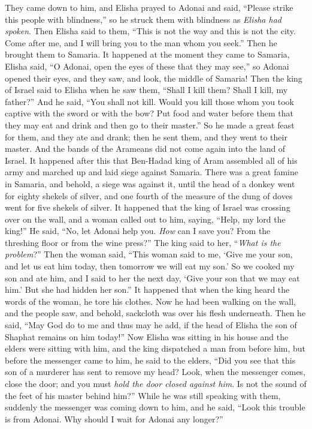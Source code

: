 \begin{biblechapter}
\verse They came down to him, and Elisha prayed to Adonai and said, “Please strike this people with blindness,” so he struck them with blindness as \textit{Elisha had spoken}.
\verse Then Elisha said to them, “This is not the way and this is not the city. Come after me, and I will bring you to the man whom you seek.” Then he brought them to Samaria.
\verse It happened at the moment they came to Samaria, Elisha said, “O Adonai, open the eyes of these that they may see,” so Adonai opened their eyes, and they saw, and look, the middle of Samaria!
\verse Then the king of Israel said to Elisha when he saw them, “Shall I kill them? Shall I kill, my father?”
\verse And he said, “You shall not kill. Would you kill those whom you took captive with the sword or with the bow? Put food and water before them that they may eat and drink and then go to their master.”
\verse So he made a great feast for them, and they ate and drank; then he sent them, and they went to their master. And the bands of the Arameans did not come again into the land of Israel.
 It happened after this that Ben-Hadad king of Aram assembled all of his army and marched up and laid siege against Samaria.
\verse There was a great famine in Samaria, and behold, a siege was against it, until the head of a donkey went for eighty shekels of silver, and one fourth of the measure of the dung of doves went for five shekels of silver.
\verse It happened that the king of Israel was crossing over on the wall, and a woman called out to him, saying, “Help, my lord the king!”
\verse He said, “No, let Adonai help you. \textit{How} can I save you? From the threshing floor or from the wine press?”
\verse The king said to her, “\textit{What is the problem}?” Then the woman said, “This woman said to me, ‘Give me your son, and let us eat him today, then tomorrow we will eat my son.’
\verse So we cooked my son and ate him, and I said to her the next day, ‘Give your son that we may eat him.’ But she had hidden her son.”
\verse It happened that when the king heard the words of the woman, he tore his clothes. Now he had been walking on the wall, and the people saw, and behold, sackcloth was over his flesh underneath.
\verse Then he said, “May God do to me and thus may he add, if the head of Elisha the son of Shaphat remains on him today!”
\verse Now Elisha was sitting in his house and the elders were sitting with him, and the king dispatched a man from before him, but before the messenger came to him, he said to the elders, “Did you see that this son of a murderer has sent to remove my head? Look, when the messenger comes, close the door; and you must \textit{hold the door closed against him}. Is not the sound of the feet of his master behind him?”
\verse While he was still speaking with them, suddenly the messenger was coming down to him, and he said, “Look this trouble is from Adonai. Why should I wait for Adonai any longer?”
\end{biblechapter}

